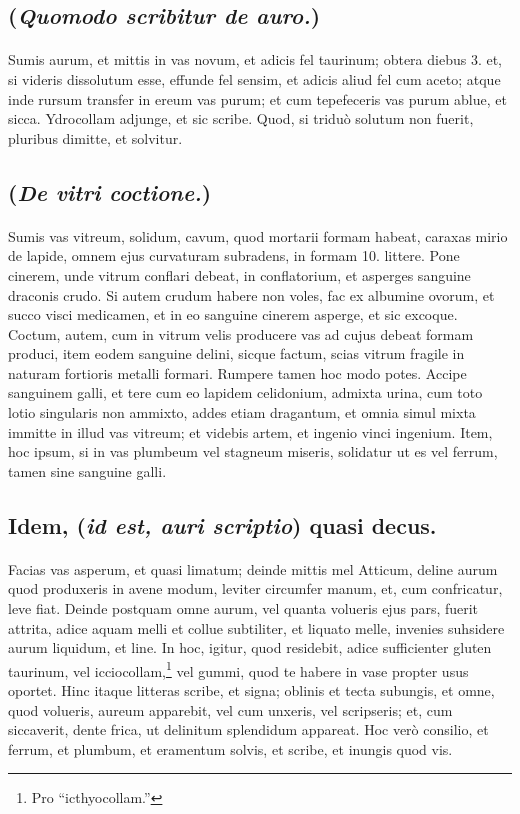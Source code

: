 \documentclass[a4paper, 11pt, oneside, polutonikogreek, italian]{article}
\begin{document}
\subsection{(\emph{Quomodo scribitur de auro.})}
\paragraph{}
Sumis aurum, et mittis in vas novum, et adicis fel taurinum; obtera diebus 3. et, si videris dissolutum esse, effunde fel sensim, et adicis aliud fel cum aceto; atque inde rursum transfer in ereum vas purum; et cum tepefeceris vas purum ablue, et sicca. Ydrocollam adjunge, et sic scribe. Quod, si triduò solutum non fuerit, pluribus dimitte, et solvitur.

\subsection{(\emph{De vitri coctione.})}
\paragraph{}
Sumis vas vitreum, solidum, cavum, quod mortarii formam habeat, caraxas mirio de lapide, omnem ejus curvaturam subradens, in formam 10. littere. Pone cinerem, unde vitrum conflari debeat, in conflatorium, et asperges sanguine draconis crudo. Si autem crudum habere non voles, fac ex albumine ovorum, et succo visci medicamen, et in eo sanguine cinerem asperge, et sic excoque. Coctum, autem, cum in vitrum velis producere vas ad cujus debeat formam produci, item eodem sanguine delini, sicque factum, scias vitrum fragile in naturam fortioris metalli formari. Rumpere tamen hoc modo potes. Accipe sanguinem galli, et tere cum eo lapidem celidonium, admixta urina, cum toto lotio singularis non ammixto, addes etiam dragantum, et omnia simul mixta immitte in illud vas vitreum; et videbis artem, et ingenio vinci ingenium. Item, hoc ipsum, si in vas plumbeum vel stagneum miseris, solidatur ut es vel ferrum, tamen sine sanguine galli.

\subsection{Idem, (\emph{id est, auri scriptio}) quasi decus.}
\paragraph{}
Facias vas asperum, et quasi limatum; deinde mittis mel Atticum, deline aurum quod produxeris in avene modum, leviter circumfer manum, et, cum confricatur, leve fiat. Deinde postquam omne aurum, vel quanta volueris ejus pars, fuerit attrita, adice aquam melli et collue subtiliter, et liquato melle, invenies suhsidere aurum liquidum, et line. In hoc, igitur, quod residebit, adice sufficienter gluten taurinum, vel icciocollam,\footnote{Pro ``icthyocollam.''} vel gummi, quod te habere in vase propter usus oportet. Hinc itaque litteras scribe, et signa; oblinis et tecta subungis, et omne, quod volueris, aureum apparebit, vel cum unxeris, vel scripseris; et, cum siccaverit, dente frica, ut delinitum splendidum appareat. Hoc verò consilio, et ferrum, et plumbum, et eramentum solvis, et scribe, et inungis quod vis.
\end{document}
